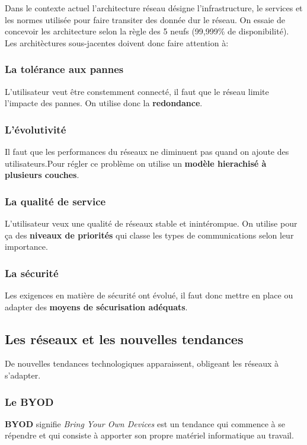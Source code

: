  \indent
 Dans le contexte actuel l'architecture réseau désigne l'infrastructure, le services et les normes utilisée pour faire transiter des donnée dur le réseau. On essaie de concevoir les architecture selon la règle des 5 neufs (99,999\% de disponibilité). Les architèctures sous-jacentes doivent donc faire attention à:

 \subsubsection{La tolérance aux pannes}
 L'utilisateur veut être constemment connecté, il faut que le réseau limite l'impacte des pannes. On utilise donc la \textbf{redondance}.

 \subsubsection{L'évolutivité}
 Il faut que les performances du réseaux ne diminuent pas quand on ajoute des utilisateurs.Pour régler ce problème on utilise un \textbf{modèle hierachisé à plusieurs couches}.

 \subsubsection{La qualité de service}
 L'utilisateur veux une qualité de réseaux stable et inintérompue. On utilise pour ça des \textbf{niveaux de priorités} qui classe les types de communications selon leur importance.

 \subsubsection{La sécurité}
 Les exigences en matière de sécurité ont évolué, il faut donc mettre en place ou adapter des \textbf{moyens de sécurisation adéquats}.

 \subsection{Les réseaux et les nouvelles tendances}
 De nouvelles tendances technologiques apparaissent, obligeant les réseaux à s'adapter.

 \subsubsection{Le BYOD}
 \textbf{BYOD} signifie \textit{Bring Your Own Devices} est un tendance qui commence à se répendre et qui consiste à apporter son propre matériel informatique au travail.

